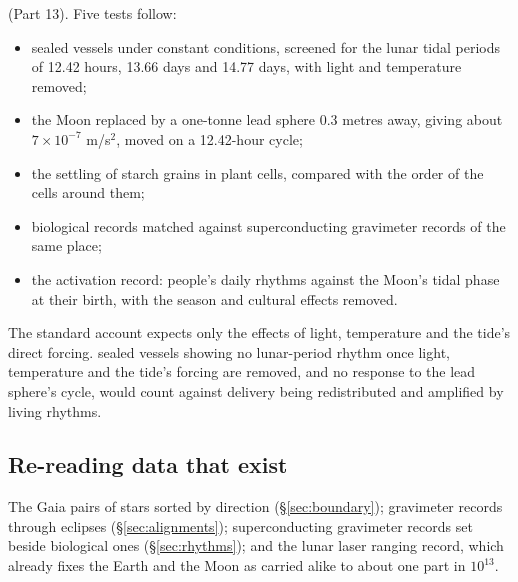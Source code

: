 \documentclass[11pt,a4paper]{article}
\begin{document}
 (Part 13). Five tests follow:
\begin{itemize}
\item sealed vessels under constant conditions, screened for the lunar tidal periods of 12.42 hours, 13.66 days and 14.77 days, with light and temperature removed;
\item the Moon replaced by a one-tonne lead sphere 0.3 metres away, giving about $7\times10^{-7}$ m/s$^2$, moved on a 12.42-hour cycle;
\item the settling of starch grains in plant cells, compared with the order of the cells around them;
\item biological records matched against superconducting gravimeter records of the same place;
\item the activation record: people's daily rhythms against the Moon's tidal phase at their birth, with the season and cultural effects removed.
\end{itemize}
The standard account expects only the effects of light, temperature and the tide's direct forcing.  sealed vessels showing no lunar-period rhythm once light, temperature and the tide's forcing are removed, and no response to the lead sphere's cycle, would count against delivery being redistributed and amplified by living rhythms.

\subsection{Re-reading data that exist}

 The Gaia pairs of stars sorted by direction (§\ref{sec:boundary}); gravimeter records through eclipses (§\ref{sec:alignments}); superconducting gravimeter records set beside biological ones (§\ref{sec:rhythms}); and the lunar laser ranging record, which already fixes the Earth and the Moon as carried alike to about one part in $10^{13}$.
\end{document}
